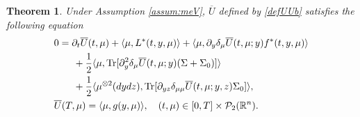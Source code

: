 \documentclass{amsart}
\newtheorem{theorem}{Theorem}[section]
\theoremstyle{definition}
\theoremstyle{remark}
\def\cal{\mathcal}
\numberwithin{equation}{section}
\begin{document}
\begin{theorem} Under Assumption \ref{assum:meV},
 $\overline U$ defined by \eqref{defUUb} satisfies
the following equation
\begin{align}
&0=  \partial_t\overline U(t,\mu) +\langle \mu,  L^*(t,y, \mu)    \rangle
+
 \langle \mu, \partial_y \delta_\mu \overline U (t, \mu; y) f^*(t, y, \mu)   \rangle  \label{MEUb} \\
& \qquad + \frac12 \langle \mu,  {\rm Tr} [\partial_{y}^2 \delta_\mu \overline U (t,\mu; y)(\Sigma +\Sigma_0)]  \rangle  \nonumber\\
&\qquad + \frac12 \langle  \mu^{\otimes2}(dydz),   {\rm Tr}[ \partial_{yz} \delta_{\mu\mu} \overline U(t,  \mu; y,z) \Sigma_0]      \rangle , \notag\\
&\overline U(T,\mu)=  \langle \mu, g(y,\mu) \rangle ,\quad (t,\mu)\in[0,T]\times
 {\cal P}_2(\mathbb{R}^n).
\end{align}

\end{theorem}
\end{document}
